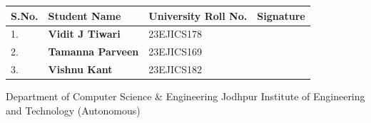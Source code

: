 \documentclass[11pt,a4paper]{article}
\begin{document}
\begin{table}[htbp]
\centering
\renewcommand{\arraystretch}{1.3}
\begin{tabularx}{\textwidth}{|l|l|X|>{\centering\arraybackslash}p{4.5cm}|}
\hline
\rowcolor{tablehead}
\textbf{\color{white}S.No.} & \textbf{\color{white}Student Name} & \textbf{\color{white}University Roll No.} & \textbf{\color{white}Signature} \\ \hline
1. & \textbf{Vidit J Tiwari} & 23EJICS178 & \vspace{0.4cm} \hrulefill \\ \hline
2. & \textbf{Tamanna Parveen} & 23EJICS169 & \vspace{0.4cm} \hrulefill \\ \hline
3. & \textbf{Vishnu Kant} & 23EJICS182 & \vspace{0.4cm} \hrulefill \\ \hline
\end{tabularx}
\end{table}

\vspace{0.3cm}
\begin{center}
    \small \color{gray}
    Department of Computer Science \& Engineering \textbar{} Jodhpur Institute of Engineering and Technology (Autonomous)
\end{center}
\end{document}
